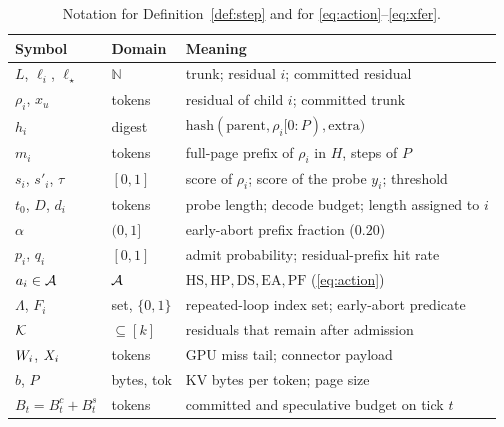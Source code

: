 \begin{table}[t]
\centering
\caption{Notation for Definition~\ref{def:step} and for \eqref{eq:action}--\eqref{eq:xfer}.}
\label{tab:notation}
\scriptsize
\setlength{\tabcolsep}{3.2pt}
\begin{tabular}{@{}llp{}@{}}
\toprule
Symbol & Domain & Meaning \\
\midrule
$L$, $\ell_i$, $\ell_\star$ & $\mathbb{N}$ & trunk; residual $i$; committed residual \\
$\rho_i$, $x_u$ & tokens & residual of child $i$; committed trunk \\
$h_i$ & digest & $\mathrm{hash}(\mathrm{parent},\rho_i[0{:}P),\mathrm{extra})$ \\
$m_i$ & tokens & full-page prefix of $\rho_i$ in $H$, steps of $P$ \\
$s_i$, $s'_i$, $\tau$ & $[0,1]$ & score of $\rho_i$; score of the probe $y_i$; threshold \\
$t_0$, $D$, $d_i$ & tokens & probe length; decode budget; length assigned to $i$ \\
$\alpha$ & $(0,1]$ & early-abort prefix fraction ($0.20$) \\
$p_i$, $q_i$ & $[0,1]$ & admit probability; residual-prefix hit rate \\
$a_i\in\mathcal{A}$ & $\mathcal{A}$ & $\mathrm{HS},\mathrm{HP},\mathrm{DS},\mathrm{EA},\mathrm{PF}$ (\eqref{eq:action}) \\
$\Lambda$, $F_i$ & set, $\{0,1\}$ & repeated-loop index set; early-abort predicate \\
$\mathcal{K}$ & $\subseteq[k]$ & residuals that remain after admission \\
$W_i$, $X_i$ & tokens & GPU miss tail; connector payload \\
$b$, $P$ & bytes, tok & KV bytes per token; page size \\
$B_t=B^c_t+B^s_t$ & tokens & committed and speculative budget on tick $t$ \\
\bottomrule
\end{tabular}
\end{table}
